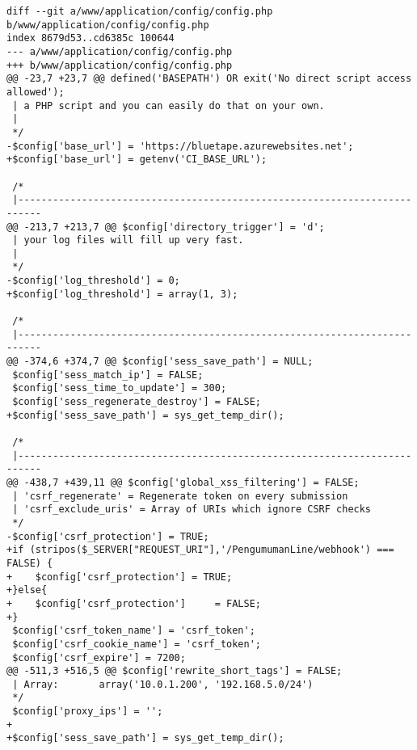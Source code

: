 \begin{lstlisting}[caption=config.php]
diff --git a/www/application/config/config.php b/www/application/config/config.php
index 8679d53..cd6385c 100644
--- a/www/application/config/config.php
+++ b/www/application/config/config.php
@@ -23,7 +23,7 @@ defined('BASEPATH') OR exit('No direct script access allowed');
 | a PHP script and you can easily do that on your own.
 |
 */
-$config['base_url'] = 'https://bluetape.azurewebsites.net';
+$config['base_url'] = getenv('CI_BASE_URL');
 
 /*
 |--------------------------------------------------------------------------
@@ -213,7 +213,7 @@ $config['directory_trigger'] = 'd';
 | your log files will fill up very fast.
 |
 */
-$config['log_threshold'] = 0;
+$config['log_threshold'] = array(1, 3);
 
 /*
 |--------------------------------------------------------------------------
@@ -374,6 +374,7 @@ $config['sess_save_path'] = NULL;
 $config['sess_match_ip'] = FALSE;
 $config['sess_time_to_update'] = 300;
 $config['sess_regenerate_destroy'] = FALSE;
+$config['sess_save_path'] = sys_get_temp_dir();
 
 /*
 |--------------------------------------------------------------------------
@@ -438,7 +439,11 @@ $config['global_xss_filtering'] = FALSE;
 | 'csrf_regenerate' = Regenerate token on every submission
 | 'csrf_exclude_uris' = Array of URIs which ignore CSRF checks
 */
-$config['csrf_protection'] = TRUE;
+if (stripos($_SERVER["REQUEST_URI"],'/PengumumanLine/webhook') === FALSE) {
+    $config['csrf_protection'] = TRUE;
+}else{ 
+    $config['csrf_protection'] 	= FALSE; 
+}
 $config['csrf_token_name'] = 'csrf_token';
 $config['csrf_cookie_name'] = 'csrf_token';
 $config['csrf_expire'] = 7200;
@@ -511,3 +516,5 @@ $config['rewrite_short_tags'] = FALSE;
 | Array:		array('10.0.1.200', '192.168.5.0/24')
 */
 $config['proxy_ips'] = '';
+
+$config['sess_save_path'] = sys_get_temp_dir();
\end{lstlisting}



